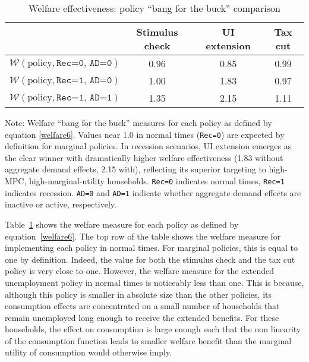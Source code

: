\documentclass[qe]{econsocart}
\begin{document}
\begin{table}[tb] 
  \caption{Welfare effectiveness: policy ``bang for the buck'' comparison}
  \label{tab:welfare6}
  \centering

  \begin{tabular*}
    {\textwidth}{@{\extracolsep{\fill}}lccc@{}} %
    \hline
    & Stimulus check & UI extension & Tax cut \\ \hline
    $\mathcal{W}(\text{policy}, \texttt{Rec=0, AD=0})$ & 0.96           & 0.85         & 0.99    \\
    $\mathcal{W}(\text{policy}, \texttt{Rec=1, AD=0})$ & 1.00           & 1.83         & 0.97    \\
    $\mathcal{W}(\text{policy}, \texttt{Rec=1, AD=1})$ & 1.35           & 2.15         & 1.11    \\
    \hline
  \end{tabular*}

  \parbox{\textwidth}{
    \medskip
    \footnotesize Note: Welfare ``bang for the buck'' measures for each policy as defined by equation \eqref{welfare6}. Values near 1.0 in normal times (\texttt{Rec=0}) are expected by definition for marginal policies. In recession scenarios, UI extension emerges as the clear winner with dramatically higher welfare effectiveness (1.83 without aggregate demand effects, 2.15 with), reflecting its superior targeting to high-MPC, high-marginal-utility households. \texttt{Rec=0} indicates normal times, \texttt{Rec=1} indicates recession. \texttt{AD=0} and \texttt{AD=1} indicate whether aggregate demand effects are inactive or active, respectively.
  }

\end{table}

\vspace{0.5em}

Table~\ref{tab:welfare6} shows the welfare measure for each policy as defined by equation~\eqref{welfare6}.
The top row of the table shows the welfare measure for implementing each policy in normal times.
For marginal policies, this is equal to one by definition.
Indeed, the value for both the stimulus check and the tax cut policy is very close to one.
However, the welfare measure for the extended unemployment policy in normal times is noticeably less than one.
This is because, although this policy is smaller in absolute size than the other policies, its consumption effects are concentrated on a small number of households that remain unemployed long enough to receive the extended benefits.
For these households, the effect on consumption is large enough such that the non linearity of the consumption function leads to smaller welfare benefit than the marginal utility of consumption would otherwise imply.
\end{document}

